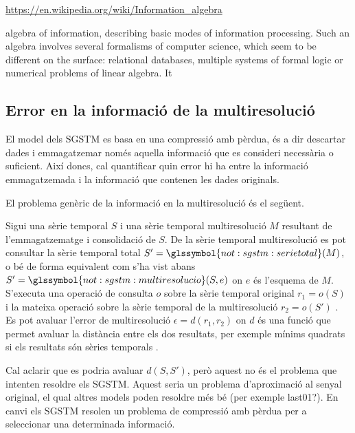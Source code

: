 \url{https://en.wikipedia.org/wiki/Information_algebra}

algebra of information, describing basic modes of information processing. Such an algebra involves several formalisms of computer science, which seem to be different on the surface: relational databases, multiple systems of formal logic or numerical problems of linear algebra. It 






\subsection{Error en la informació de la multiresolució}

El model dels \gls{SGSTM} es basa en una compressió amb pèrdua, és a
dir descartar dades i emmagatzemar només aquella informació que es
consideri necessària o suficient. Així doncs, cal quantificar quin
error hi ha entre la informació emmagatzemada i la informació que
contenen les dades originals.


El problema genèric de la informació en la multiresolució és el següent.
\begin{definition}
Sigui una sèrie temporal $S$ i una sèrie temporal multiresolució $M$
resultant de l'emmagatzematge i consolidació de $S$. De la sèrie
temporal multiresolució es pot consultar la sèrie temporal total
$S'=\glssymbol{not:sgstm:serietotal}(M)$, o bé de forma equivalent com
s'ha vist abans $S'=\glssymbol{not:sgstm:multiresolucio}(S,e)$ on $e$
és l'esquema de $M$.  S'executa una operació de consulta $o$ sobre la
sèrie temporal original $r_1=o(S)$ i la mateixa operació sobre la
sèrie temporal de la multiresolució $r_2=o(S')$ . Es pot avaluar l'error
de multiresolució $\epsilon=d(r_1,r_2)$ on $d$ és una funció que permet avaluar
la distància entre els dos resultats, per exemple mínims quadrats si
els resultats són sèries temporals .
\end{definition}


Cal aclarir que es podria avaluar $d(S,S')$, però aquest no és el
problema que intenten resoldre els \gls{SGSTM}. Aquest seria un
problema d'aproximació al senyal original, el qual altres models poden
resoldre més bé (per exemple last01?). En canvi els \gls{SGSTM} resolen un
problema de compressió amb pèrdua per a seleccionar una determinada
informació.




